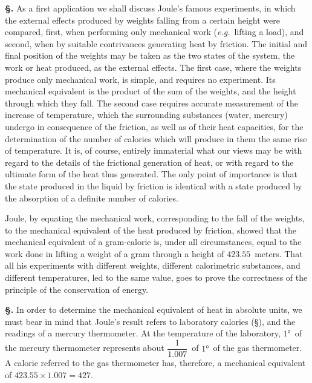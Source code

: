 \documentclass[12pt]{book}[2005/09/16]
\newcommand{\Section}[1]{
  \medskip\par\textbf{§\;#1}
  \label{section:#1}
}
\newcommand{\SecRef}[2][§\;]{\hyperref[section:#2.]{{\upshape #1#2}}}
\newcommand{\PageSep}[1]{\ignorespaces}
\newcommand{\eg}{\emph{e.g.}}
\begin{document}
\Section{60.} As a first application we shall discuss Joule's famous
%
experiments, in which the external effects produced by
weights falling from a certain height were compared, first,
when performing only mechanical work (\eg\ lifting a load),
and second, when by suitable contrivances generating heat
\PageSep{41}
by friction. The initial and final position of the weights
may be taken as the two states of the system, the work or
heat produced, as the external effects. The first case,
where the weights produce only mechanical work, is simple,
and requires no experiment. Its mechanical equivalent is
the product of the sum of the weights, and the height
through which they fall. The second case requires accurate
measurement of the increase of temperature, which the
surrounding substances (water, mercury) undergo in consequence
of the friction, as well as of their heat capacities, for
the determination of the number of calories which will
produce in them the same rise of temperature. It is, of
course, entirely immaterial what our views may be with
regard to the details of the frictional generation of heat, or
with regard to the ultimate form of the heat thus generated.
The only point of importance is that the state produced
in the liquid by friction is identical with a state produced
by the absorption of a definite number of calories.

Joule, by equating the mechanical work, corresponding
%
%
to the fall of the weights, to the mechanical equivalent of
the heat produced by friction, showed that the mechanical
equivalent of a gram-calorie is, under all circumstances,
equal to the work done in lifting a weight of a gram through
a height of $423.55$~meters. That all his experiments with
different weights, different calorimetric substances, and
different temperatures, led to the same value, goes to prove
the correctness of the principle of the conservation of
energy.

\Section{61.} In order to determine the mechanical equivalent
of heat in absolute units, we must bear in mind that Joule's
result refers to laboratory calories (\SecRef{45}), and the readings
of a mercury thermometer. At the temperature of the
laboratory, $1°$~of the mercury thermometer represents about
$\dfrac{1}{1.007}$~of $1°$~of the gas thermometer. A calorie referred to
the gas thermometer has, therefore, a mechanical equivalent
of $423.55 × 1.007 = 427$.
\PageSep{42}
\end{document}
